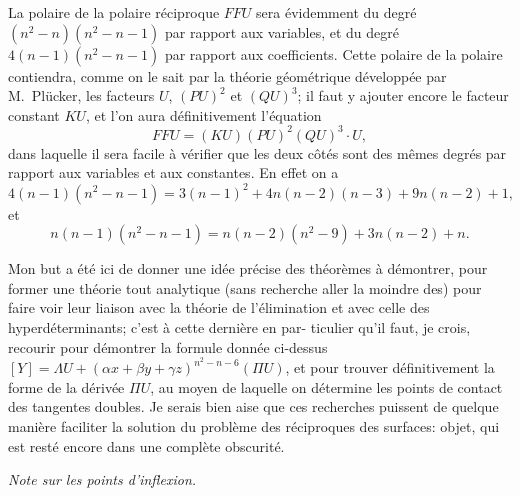 \documentclass[11pt]{article}
\begin{document}
\medskip
La polaire de la polaire r\'eciproque $F F U$ sera \'evidemment du degr\'e $(n^{2} - n)(n^{2} - n - 1)$
par rapport aux variables, et du degr\'e $4(n - 1)(n^{2} - n - 1)$ par rapport aux coefficients.
Cette polaire de la polaire contiendra, comme on le sait par la th\'eorie g\'eom\'etrique
d\'evelopp\'ee par M.~Pl\"ucker, les facteurs $U$, $(P U)^{2}$ et $(Q U)^{3}$; il faut y ajouter encore
le facteur constant $K U$, et l'on aura d\'efinitivement l'\'equation
\[
F F U = (K U)(P U)^{2}(Q U)^{3} \cdot U,
\]
dans laquelle il sera facile \`a v\'erifier que les deux c\^ot\'es sont des m\^emes degr\'es par
rapport aux variables et aux constantes. En effet on a
\[
4(n - 1)(n^{2} - n - 1) = 3(n - 1)^{2} + 4 n(n - 2)(n - 3) + 9 n(n - 2) + 1,
\]
et
\[
n(n - 1)(n^{2} - n - 1) = n(n - 2)(n^{2} - 9) + 3 n(n - 2) + n.
\]

\medskip
Mon but a \'et\'e ici de donner une id\'ee pr\'ecise des th\'eor\`emes \`a d\'emontrer, pour
former une th\'eorie tout analytique (sans recherche aller la moindre des) pour faire voir
leur liaison avec la th\'eorie de l'\'elimination et avec celle des hyperd\'eterminants; c'est \`a cette derni\`ere en par-
ticulier qu'il faut, je crois, recourir pour d\'emontrer la formule donn\'ee ci-dessus
$[Y] = \Lambda U + (\alpha x + \beta y + \gamma z)^{n^{2} - n - 6}(\Pi U)$, et pour trouver d\'efinitivement la forme de la
d\'eriv\'ee $\Pi U$, au moyen de laquelle on d\'etermine les points de contact des tangentes
doubles. Je serais bien aise que ces recherches puissent de quelque mani\`ere faciliter
la solution du probl\`eme des r\'eciproques des surfaces: objet, qui est rest\'e encore dans
une compl\`ete obscurit\'e.

\bigskip
\noindent\textit{Note sur les points d'inflexion.}
\end{document}
